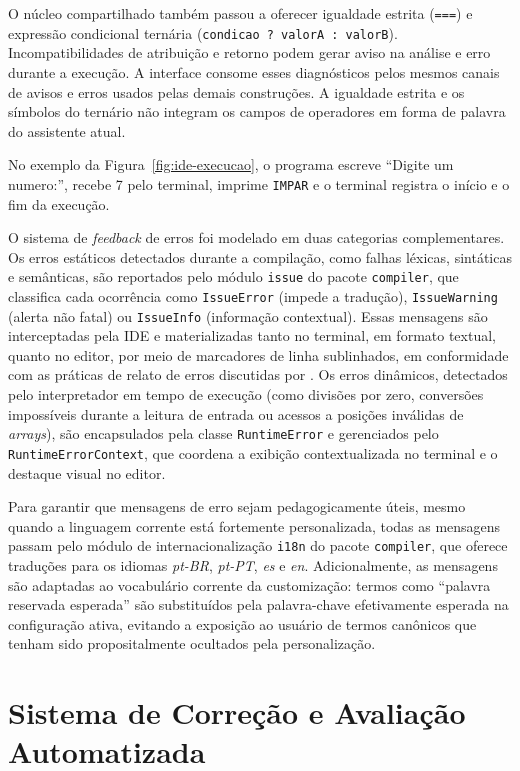 O núcleo compartilhado também passou a oferecer igualdade estrita (\texttt{===}) e expressão condicional ternária (\texttt{condicao ? valorA : valorB}). Incompatibilidades de atribuição e retorno podem gerar aviso na análise e erro durante a execução. A interface consome esses diagnósticos pelos mesmos canais de avisos e erros usados pelas demais construções. A igualdade estrita e os símbolos do ternário não integram os campos de operadores em forma de palavra do assistente atual.

No exemplo da Figura~\ref{fig:ide-execucao}, o programa escreve ``Digite um numero:'', recebe 7 pelo terminal, imprime \texttt{IMPAR} e o terminal registra o início e o fim da execução.

O sistema de \textit{feedback} de erros foi modelado em duas categorias complementares. Os erros estáticos detectados durante a compilação, como falhas léxicas, sintáticas e semânticas, são reportados pelo módulo \texttt{issue} do pacote \texttt{compiler}, que classifica cada ocorrência como \texttt{IssueError} (impede a tradução), \texttt{IssueWarning} (alerta não fatal) ou \texttt{IssueInfo} (informação contextual). Essas mensagens são interceptadas pela IDE e materializadas tanto no terminal, em formato textual, quanto no editor, por meio de marcadores de linha sublinhados, em conformidade com as práticas de relato de erros discutidas por . Os erros dinâmicos, detectados pelo interpretador em tempo de execução (como divisões por zero, conversões impossíveis durante a leitura de entrada ou acessos a posições inválidas de \textit{arrays}), são encapsulados pela classe \texttt{RuntimeError} e gerenciados pelo \texttt{RuntimeErrorContext}, que coordena a exibição contextualizada no terminal e o destaque visual no editor.

Para garantir que mensagens de erro sejam pedagogicamente úteis, mesmo quando a linguagem corrente está fortemente personalizada, todas as mensagens passam pelo módulo de internacionalização \texttt{i18n} do pacote \texttt{compiler}, que oferece traduções para os idiomas \textit{pt-BR}, \textit{pt-PT}, \textit{es} e \textit{en}. Adicionalmente, as mensagens são adaptadas ao vocabulário corrente da customização: termos como ``palavra reservada esperada'' são substituídos pela palavra-chave efetivamente esperada na configuração ativa, evitando a exposição ao usuário de termos canônicos que tenham sido propositalmente ocultados pela personalização.

\section{Sistema de Correção e Avaliação Automatizada}
\label{sec:sistema-correcao}

